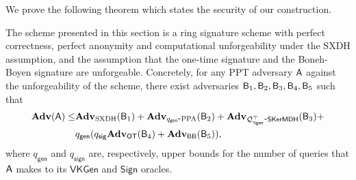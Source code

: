 We prove the following theorem which states the security of our construction.

\begin{theorem}\label{theo:security}
The scheme presented in this section is a ring signature scheme
with perfect correctness, perfect anonymity and computational unforgeability under the
$\mathrm{SXDH}$ assumption, and the assumption
that the one-time signature and the Boneh-Boyen signature are unforgeable.
Concretely, for any PPT adversary $\mathsf{A}$ against the unforgeability of the scheme, there exist adversaries $\mathsf{B}_1,\mathsf{B}_2,\mathsf{B}_3,\mathsf{B}_4,\mathsf{B}_5$ such that
\begin{align*}
\mathbf{Adv}(\mathsf{A})\leq &\mathbf{Adv}_{\mathrm{SXDH}}(\mathsf{B}_1)+\mathbf{Adv}_{q_\mathsf{gen}\mbox{-}\mathrm{PPA}}(\mathsf{B}_2)+\mathbf{Adv}_{\mathcal{Q}^\top_{q_\mathsf{gen}}\mbox{-}\mathsf{SKerMDH}}(\mathsf{B}_3)+\\
&q_\mathsf{gen}(q_\mathsf{sig}\mathbf{Adv}_{\mathsf{OT}}(\mathsf{B}_4)+\mathbf{Adv}_{\mathsf{BB}}(\mathsf{B}_5)),
\end{align*}
where $q_\mathsf{gen}$ and $q_\mathsf{sign}$ are, respectively, upper bounds for the number of queries that $\mathsf{A}$ makes to its $\mathsf{VKGen}$ and $\mathsf{Sign}$ oracles.
\end{theorem}